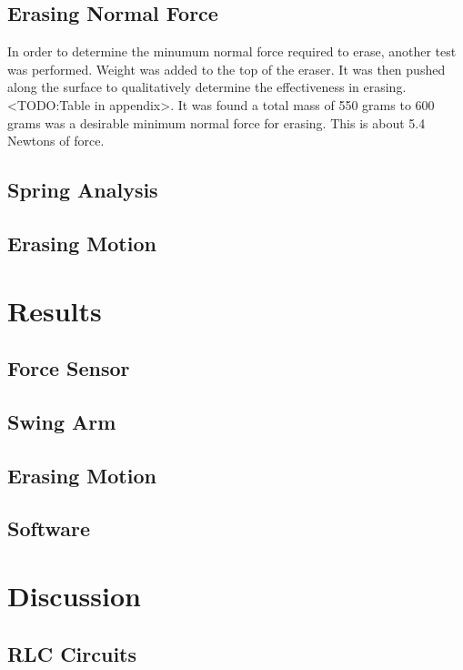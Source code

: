 \documentclass[12pt]{article}
\begin{document}
      	\subsection{Erasing Normal Force}
				
				In order to determine the minumum normal force required to erase, another test was performed. Weight was added to the top of the eraser. It was then pushed along the surface to qualitatively determine the effectiveness in erasing. <TODO:Table in appendix>. It was found a total mass of 550 grams to 600 grams was a desirable minimum normal force for erasing. This is about 5.4 Newtons of force.

				\subsection{Spring Analysis}
				
				\subsection{Erasing Motion}

				

    \section{Results}
        \subsection{Force Sensor}
				
				\subsection{Swing Arm}

				\subsection{Erasing Motion}

				\subsection{Software}

    \section{Discussion}
        \subsection{RLC Circuits}
    
\end{document}
